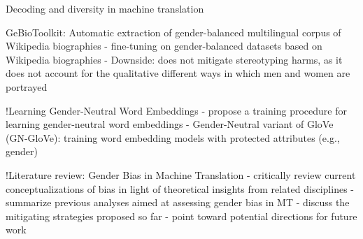Decoding and diversity in machine translation \parencite{roberts2020decoding}

GeBioToolkit: Automatic extraction of gender-balanced multilingual corpus of Wikipedia biographies \parencite{costa2019gebiotoolkit}
- fine-tuning on gender-balanced datasets based on Wikipedia biographies
- Downside: does not mitigate stereotyping harms, as it does not account for the qualitative different ways in which men and women are portrayed

!Learning Gender-Neutral Word Embeddings \parencite{Zhao_2018_GN-GloVe}
- propose a training procedure for learning gender-neutral word embeddings
- Gender-Neutral variant of GloVe (GN-GloVe): training word embedding models with protected attributes (e.g., gender)



!Literature review: Gender Bias in Machine Translation \parencite{Savoldi_2021}
- critically review current conceptualizations of bias in light of theoretical insights from related disciplines
- summarize previous analyses aimed at assessing gender bias in MT
- discuss the mitigating strategies proposed so far
- point toward potential directions for future work


